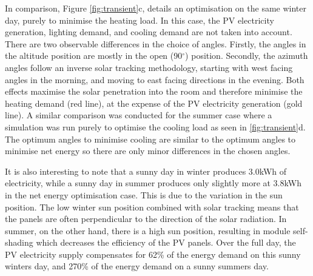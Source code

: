In comparison, Figure \ref{fig:transient}c, details an optimisation on the same winter day, purely to minimise the heating load. In this case, the PV electricity generation, lighting demand, and cooling demand are not taken into account. There are two observable differences in the choice of angles. Firstly, the angles in the altitude position are mostly in the open (90$^{\circ}$) position. Secondly, the azimuth angles follow an inverse solar tracking methodology, starting with west facing angles in the morning, and moving to east facing directions in the evening. Both effects maximise the solar penetration into the room and therefore minimise the heating demand (red line), at the expense of the PV electricity generation (gold line). A similar comparison was conducted for the summer case where a simulation was run purely to optimise the cooling load as seen in \ref{fig:transient}d. The optimum angles to minimise cooling are similar to the optimum angles to minimise net energy so there are only minor differences in the chosen angles.

It is also interesting to note that a sunny day in winter produces 3.0kWh of electricity, while a sunny day in summer produces only slightly more at 3.8kWh in the net energy optimisation case. This is due to the variation in the sun position. The  low winter sun position combined with solar tracking means that the panels are often perpendicular to the direction of the solar radiation. In summer, on the other hand, there is a high sun position, resulting in module self-shading which decreases the efficiency of the PV panels. Over the full day, the PV electricity supply compensates for 62\% of the energy demand on this sunny winters day, and 270\% of the energy demand on a sunny summers day. 



